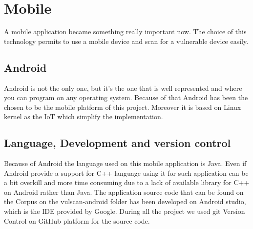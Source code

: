 \documentclass{report}
\begin{document}
\section{Mobile}
A mobile application became something really important now. The choice of this technology permits to use a mobile device and scan for a vulnerable device easily.

\subsection{Android}
Android is not the only one, but it's the one that is well represented and where you can program on any operating system. Because of that Android has been the chosen to be the mobile platform of this project. Moreover it is based on Linux kernel as the IoT which simplify the implementation.

\subsection{Language, Development and version control}
Because of Android the language used on this mobile application is Java. Even if Android provide a support for C++ language using it for such application can be a bit overkill and more time consuming due to a lack of available library for C++ on Android rather than Java.\newline
The application source code that can be found on the Corpus on the vulscan-android folder has been developed on Android studio, which is the IDE provided by Google.\newline
During all the project we used git Version Control on GitHub\autocite{github} platform for the source code.
\end{document}
